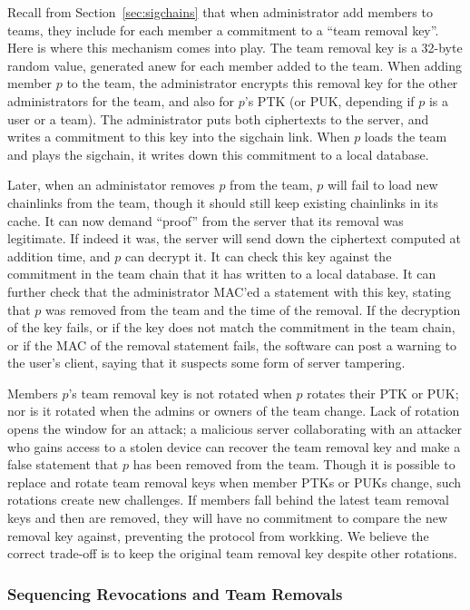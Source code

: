 Recall from Section~\ref{sec:sigchains} that when administrator add members to
teams, they include for each member a commitment to a ``team removal key''. Here
is where this mechanism comes into play. The team removal key is a 32-byte
random value, generated anew for each member added to the team. When adding
member $p$ to the team, the administrator encrypts this removal key for the
other administrators for the team, and also for $p$'s PTK (or PUK, depending if
$p$ is a user or a team). The administrator puts both ciphertexts to the server,
and writes a commitment to this key into the sigchain link. When $p$ loads the 
team and plays the sigchain, it writes down this commitment to a local database.

Later, when an administator removes $p$ from the team, $p$ will fail to load
new chainlinks from the team, though it should still keep existing chainlinks
in its cache. It can now demand ``proof'' from the server that its removal
was legitimate. If indeed it was, the server will send down the ciphertext
computed at addition time, and $p$ can decrypt it. It can check this key
against the commitment in the team chain that it has written to a local database.
It can further check that the administrator MAC'ed a statement with this
key, stating that $p$ was removed from the team and the time of the removal.
If the decryption of the key fails, or if the key does not match the commitment
in the team chain, or if the MAC of the removal statement fails, the software
can post a warning to the user's client, saying that it suspects some form
of server tampering.

Members $p$'s team removal key is not rotated when $p$ rotates their PTK or PUK;
nor is it rotated when the admins or owners of the team change. Lack of rotation
opens the window for an attack; a malicious server collaborating with an
attacker who gains access to a stolen device can recover the team removal key
and make a false statement that $p$ has been removed from the team. Though it is 
possible to replace and rotate team removal keys when member PTKs or PUKs change,
such rotations create new challenges. If members fall behind the latest
team removal keys and then are removed, they will have no commitment to 
compare the new removal key against, preventing the protocol from workking.
We believe the correct trade-off is to keep the original team removal key
despite other rotations.

\subsubsection{Sequencing Revocations and Team Removals}

